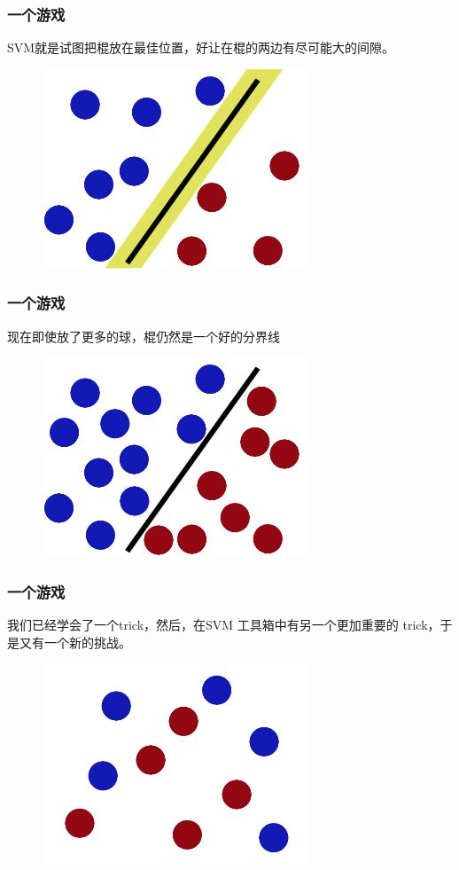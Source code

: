 \begin{frame}
\frametitle{一个游戏}	
SVM就是试图把棍放在最佳位置，好让在棍的两边有尽可能大的间隙。
           
	\begin{figure}[ht]
	\centering
	\includegraphics[width=0.5\linewidth]{partition/img/svm_5.jpg}  
	\end{figure}

\end{frame} 

\begin{frame}
\frametitle{一个游戏}	
现在即使放了更多的球，棍仍然是一个好的分界线
           
	\begin{figure}[ht]
	\centering
	\includegraphics[width=0.5\linewidth]{partition/img/svm_6.jpg}  
	\end{figure}

\end{frame} 

\begin{frame}
\frametitle{一个游戏}	
 我们已经学会了一个trick，然后，在SVM 工具箱中有另一个更加重要的 trick，于是又有一个新的挑战。
           
	\begin{figure}[ht]
	\centering
	\includegraphics[width=0.5\linewidth]{partition/img/svm_7.jpg}  
	\end{figure}

\end{frame} 

